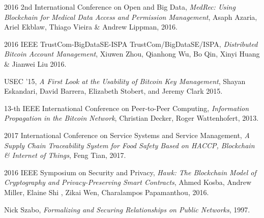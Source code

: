 \begin{thebibliography}{1}
  2016 2nd International Conference on Open and Big Data,
  \emph{MedRec: Using Blockchain for Medical Data Access and Permission
Management},
  Asaph Azaria, Ariel Ekblaw, Thiago Vieira \& Andrew Lippman,
  2016.

  2016 IEEE TrustCom-BigDataSE-ISPA TrustCom/BigDataSE/ISPA,
  \emph{Distributed Bitcoin Account Management},
  Xiuwen Zhou, Qianhong Wu, Bo Qin, Xinyi Huang \& Jianwei Liu
  2016.

  USEC ’15,
  \emph{A First Look at the Usability of Bitcoin Key Management},
  Shayan Eskandari, David Barrera, Elizabeth Stobert, and Jeremy Clark
  2015.

  13-th IEEE International Conference on Peer-to-Peer Computing,
  \emph{Information Propagation in the Bitcoin Network},
  Christian Decker, Roger Wattenhofert,
  2013.

  2017 International Conference on Service Systems and Service Management,
  \emph{A Supply Chain Traceability System for Food Safety
Based on HACCP, Blockchain \& Internet of Things},
  Feng Tian,
  2017.

  2016 IEEE Symposium on Security and Privacy,
  \emph{Hawk: The Blockchain Model of Cryptography and Privacy-Preserving Smart
Contracts},
  Ahmed Kosba, Andrew Miller, Elaine Shi , Zikai Wen, Charalampos Papamanthou,
  2016.


   Nick Szabo,
  \emph{Formalizing and Securing Relationships on Public Networks},
  1997.



\end{thebibliography}
